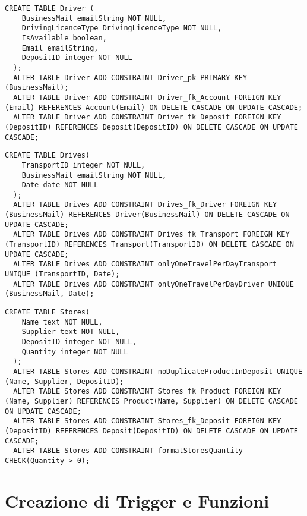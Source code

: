 \newpage
\begin{lstlisting}[caption={Creazione della tabella \textbf{Driver}}]
  CREATE TABLE Driver (
    BusinessMail emailString NOT NULL,
    DrivingLicenceType DrivingLicenceType NOT NULL,
    IsAvailable boolean,
    Email emailString, 
    DepositID integer NOT NULL 
  );
  ALTER TABLE Driver ADD CONSTRAINT Driver_pk PRIMARY KEY (BusinessMail);
  ALTER TABLE Driver ADD CONSTRAINT Driver_fk_Account FOREIGN KEY (Email) REFERENCES Account(Email) ON DELETE CASCADE ON UPDATE CASCADE;
  ALTER TABLE Driver ADD CONSTRAINT Driver_fk_Deposit FOREIGN KEY (DepositID) REFERENCES Deposit(DepositID) ON DELETE CASCADE ON UPDATE CASCADE;
\end{lstlisting}

\begin{lstlisting}[caption={Creazione della tabella \textbf{Drives}}]
  CREATE TABLE Drives(
    TransportID integer NOT NULL,
    BusinessMail emailString NOT NULL,
    Date date NOT NULL
  );
  ALTER TABLE Drives ADD CONSTRAINT Drives_fk_Driver FOREIGN KEY (BusinessMail) REFERENCES Driver(BusinessMail) ON DELETE CASCADE ON UPDATE CASCADE;
  ALTER TABLE Drives ADD CONSTRAINT Drives_fk_Transport FOREIGN KEY (TransportID) REFERENCES Transport(TransportID) ON DELETE CASCADE ON UPDATE CASCADE;
  ALTER TABLE Drives ADD CONSTRAINT onlyOneTravelPerDayTransport UNIQUE (TransportID, Date);
  ALTER TABLE Drives ADD CONSTRAINT onlyOneTravelPerDayDriver UNIQUE (BusinessMail, Date);
\end{lstlisting}

\begin{lstlisting}[caption={Creazione della tabella \textbf{Stores}}]
  CREATE TABLE Stores(
    Name text NOT NULL,
    Supplier text NOT NULL,
    DepositID integer NOT NULL,
    Quantity integer NOT NULL
  );
  ALTER TABLE Stores ADD CONSTRAINT noDuplicateProductInDeposit UNIQUE (Name, Supplier, DepositID);
  ALTER TABLE Stores ADD CONSTRAINT Stores_fk_Product FOREIGN KEY (Name, Supplier) REFERENCES Product(Name, Supplier) ON DELETE CASCADE ON UPDATE CASCADE;
  ALTER TABLE Stores ADD CONSTRAINT Stores_fk_Deposit FOREIGN KEY (DepositID) REFERENCES Deposit(DepositID) ON DELETE CASCADE ON UPDATE CASCADE;
  ALTER TABLE Stores ADD CONSTRAINT formatStoresQuantity CHECK(Quantity > 0);
\end{lstlisting}

\section{Creazione di Trigger e Funzioni}

